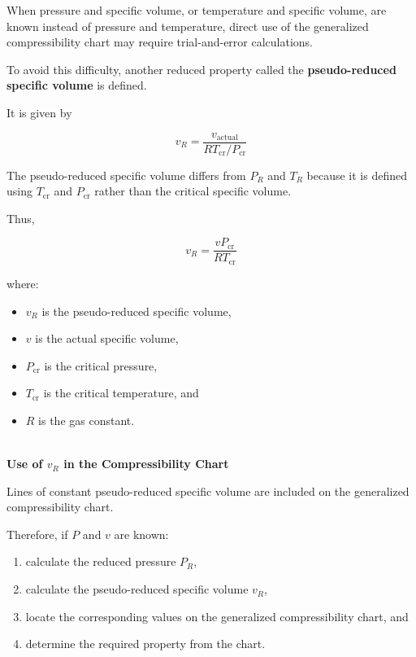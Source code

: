 \documentclass[12pt]{article}
\begin{document}
When pressure and specific volume, or temperature and specific volume, are known instead of pressure and temperature, direct use of the generalized compressibility chart may require trial-and-error calculations.

To avoid this difficulty, another reduced property called the \textbf{pseudo-reduced specific volume} is defined.

It is given by

\begin{equation*}
\boxed{
v_R=
\frac{v_{\mathrm{actual}}}
{RT_{\mathrm{cr}}/P_{\mathrm{cr}}}
}
\end{equation*}

The pseudo-reduced specific volume differs from $P_R$ and $T_R$ because it is defined using $T_{\mathrm{cr}}$ and $P_{\mathrm{cr}}$ rather than the critical specific volume.

Thus,

\begin{equation*}
\boxed{
v_R=
\frac{vP_{\mathrm{cr}}}
{RT_{\mathrm{cr}}}
}
\end{equation*}

where:
\begin{itemize}
    \item $v_R$ is the pseudo-reduced specific volume,
    \item $v$ is the actual specific volume,
    \item $P_{\mathrm{cr}}$ is the critical pressure,
    \item $T_{\mathrm{cr}}$ is the critical temperature, and
    \item $R$ is the gas constant.
\end{itemize}

\textbf{\\ Use of $v_R$ in the Compressibility Chart}

Lines of constant pseudo-reduced specific volume are included on the generalized compressibility chart.

Therefore, if $P$ and $v$ are known:
\begin{enumerate}
    \item calculate the reduced pressure $P_R$,
    \item calculate the pseudo-reduced specific volume $v_R$,
    \item locate the corresponding values on the generalized compressibility chart, and
    \item determine the required property from the chart.
\end{enumerate}
\end{document}
